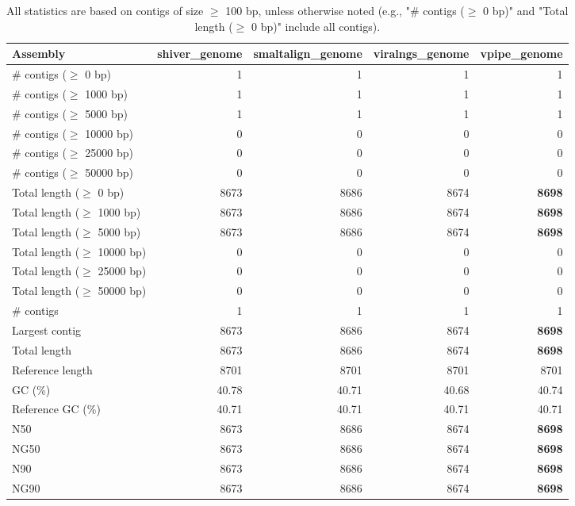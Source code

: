 \documentclass[12pt,a4paper]{article}
\begin{document}
\begin{table}[ht]
\begin{center}
\caption{All statistics are based on contigs of size $\geq$ 100 bp, unless otherwise noted (e.g., "\# contigs ($\geq$ 0 bp)" and "Total length ($\geq$ 0 bp)" include all contigs).}
\begin{tabular}{|l*{4}{|r}|}
\hline
Assembly & shiver\_genome & smaltalign\_genome & viralngs\_genome & vpipe\_genome \\ \hline
\# contigs ($\geq$ 0 bp) & 1 & 1 & 1 & 1 \\ \hline
\# contigs ($\geq$ 1000 bp) & 1 & 1 & 1 & 1 \\ \hline
\# contigs ($\geq$ 5000 bp) & 1 & 1 & 1 & 1 \\ \hline
\# contigs ($\geq$ 10000 bp) & 0 & 0 & 0 & 0 \\ \hline
\# contigs ($\geq$ 25000 bp) & 0 & 0 & 0 & 0 \\ \hline
\# contigs ($\geq$ 50000 bp) & 0 & 0 & 0 & 0 \\ \hline
Total length ($\geq$ 0 bp) & 8673 & 8686 & 8674 & {\bf 8698} \\ \hline
Total length ($\geq$ 1000 bp) & 8673 & 8686 & 8674 & {\bf 8698} \\ \hline
Total length ($\geq$ 5000 bp) & 8673 & 8686 & 8674 & {\bf 8698} \\ \hline
Total length ($\geq$ 10000 bp) & 0 & 0 & 0 & 0 \\ \hline
Total length ($\geq$ 25000 bp) & 0 & 0 & 0 & 0 \\ \hline
Total length ($\geq$ 50000 bp) & 0 & 0 & 0 & 0 \\ \hline
\# contigs & 1 & 1 & 1 & 1 \\ \hline
Largest contig & 8673 & 8686 & 8674 & {\bf 8698} \\ \hline
Total length & 8673 & 8686 & 8674 & {\bf 8698} \\ \hline
Reference length & 8701 & 8701 & 8701 & 8701 \\ \hline
GC (\%) & 40.78 & 40.71 & 40.68 & 40.74 \\ \hline
Reference GC (\%) & 40.71 & 40.71 & 40.71 & 40.71 \\ \hline
N50 & 8673 & 8686 & 8674 & {\bf 8698} \\ \hline
NG50 & 8673 & 8686 & 8674 & {\bf 8698} \\ \hline
N90 & 8673 & 8686 & 8674 & {\bf 8698} \\ \hline
NG90 & 8673 & 8686 & 8674 & {\bf 8698} \\ \hline

\end{tabular}
\end{center}
\end{table}
\end{document}
